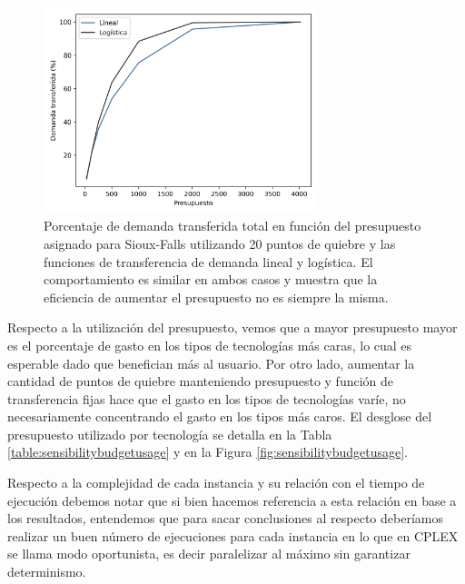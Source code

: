 \begin{figure}[h!]
  \centering
  \includegraphics[width=8cm]{../resources/demand_by_budget.png}
    \caption{Porcentaje de demanda transferida total en función del presupuesto asignado para Sioux-Falls utilizando 20 puntos de quiebre y las funciones de transferencia de demanda lineal y logística. El comportamiento es similar en ambos casos y muestra que la eficiencia de aumentar el presupuesto no es siempre la misma.}
  \label{fig:demandtransferbybudgetlinear}
\end{figure}

Respecto a la utilización del presupuesto, vemos que a mayor presupuesto mayor es el porcentaje de gasto en los tipos de tecnologías más caras, lo cual es esperable dado que benefician más al usuario. Por otro lado, aumentar la cantidad de puntos de quiebre manteniendo presupuesto y función de transferencia fijas hace que el gasto en los tipos de tecnologías varíe, no necesariamente concentrando el gasto en los tipos más caros. El desglose del presupuesto utilizado por tecnología se detalla en la Tabla \ref{table:sensibilitybudgetusage} y en la Figura \ref{fig:sensibilitybudgetusage}.

Respecto a la complejidad de cada instancia y su relación con el tiempo de ejecución debemos notar que si bien hacemos referencia a esta relación en base a los resultados, entendemos que para sacar conclusiones al respecto deberíamos realizar un buen número de ejecuciones para cada instancia en lo que en CPLEX se llama modo oportunista, es decir paralelizar al máximo sin garantizar determinismo.

